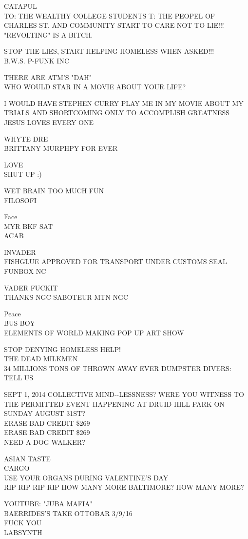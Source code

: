 \documentclass[10pt,letterpaper]{article}
\begin{document}
CATAPUL\\
TO: THE WEALTHY COLLEGE STUDENTS   T: THE PEOPEL OF CHARLES ST. AND COMMUNITY START TO CARE NOT TO LIE!!! "REVOLTING" IS A BITCH.

STOP THE LIES, START HELPING HOMELESS WHEN ASKED!!!\\
B.W.S. P{-}FUNK INC

THERE ARE ATM'S "DAH"\\
WHO WOULD STAR IN A MOVIE ABOUT YOUR LIFE?

I WOULD HAVE STEPHEN CURRY PLAY ME IN MY MOVIE ABOUT MY TRIALS AND SHORTCOMING ONLY TO ACCOMPLISH GREATNESS\\
JESUS LOVES EVERY ONE

WHYTE DRE\\
BRITTANY MURPHPY FOR EVER

LOVE\\
SHUT UP :)

WET BRAIN TOO MUCH FUN\\
FILOSOFI

Face\\
MYR BKF SAT\\
ACAB

INVADER\\
FISHGLUE APPROVED FOR TRANSPORT UNDER CUSTOMS SEAL\\
FUNBOX NC

VADER FUCKIT\\
THANKS NGC SABOTEUR MTN NGC

Peace\\
BUS BOY\\
ELEMENTS OF WORLD MAKING POP UP ART SHOW

STOP DENYING HOMELESS HELP!\\
THE DEAD MILKMEN\\
34 MILLIONS TONS OF THROWN AWAY EVER DUMPSTER DIVERS: TELL US

SEPT 1, 2014 COLLECTIVE MIND{-}{-}LESSNESS?  WERE YOU WITNESS TO THE PERMITTED EVENT HAPPENING AT DRUID HILL PARK ON SUNDAY AUGUST 31ST?\\
ERASE BAD CREDIT \$269\\
ERASE BAD CREDIT \$269\\
NEED A DOG WALKER?

ASIAN TASTE\\
CARGO\\
USE YOUR ORGANS DURING VALENTINE'S DAY\\
RIP RIP RIP RIP HOW MANY MORE BALTIMORE?  HOW MANY MORE?

YOUTUBE: "JUBA MAFIA"\\
BAERRIDES'S TAKE OTTOBAR 3/9/16\\
FUCK YOU\\
LABSYNTH
\end{document}
